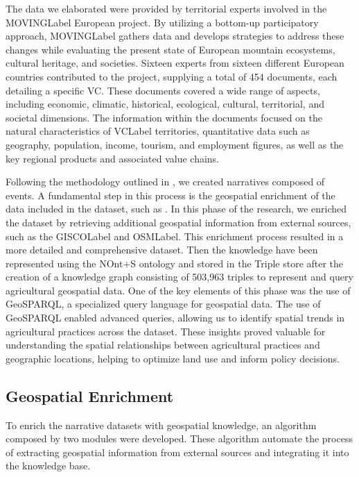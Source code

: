 The data we elaborated were provided by territorial experts involved in the \acrshort{MOVINGLabel} European project. By utilizing a bottom-up participatory approach, \acrshort{MOVINGLabel} gathers data and develops strategies to address these changes while evaluating the present state of European mountain ecosystems, cultural heritage, and societies. Sixteen experts from sixteen different European countries contributed to the project, supplying a total of 454 documents, each detailing a specific VC. These documents covered a wide range of aspects, including economic, climatic, historical, ecological, cultural, territorial, and societal dimensions. The information within the documents focused on the natural characteristics of \acrshort{VCLabel} territories, quantitative data such as geography, population, income, tourism, and employment figures, as well as the key regional products and associated value chains.

Following the methodology outlined in , we created narratives composed of events. A fundamental step in this process is the geospatial enrichment of the data included in the dataset, such as . In this phase of the research, we enriched the dataset by retrieving additional geospatial information from external sources, such as the \acrfull{GISCOLabel}\cite{GISCOEurostat} and \acrfull{OSMLabel}\cite{OpenStreetMap}. This enrichment process resulted in a more detailed and comprehensive dataset. Then the knowledge have been represented using the NOnt+S ontology and stored in the Triple store after the creation of a knowledge graph consisting of 503,963 triples to represent and query agricultural geospatial data. One of the key elements of this phase was the use of GeoSPARQL, a specialized query language for geospatial data. The use of GeoSPARQL enabled advanced queries, allowing us to identify spatial trends in agricultural practices across the dataset. These insights proved valuable for understanding the spatial relationships between agricultural practices and geographic locations, helping to optimize land use and inform policy decisions.

\subsection{Geospatial Enrichment}\label{VII-subsec:geospatialEnrichment}
To enrich the narrative datasets with geospatial knowledge, an algorithm composed by two modules were developed. These algorithm automate the process of extracting geospatial information from external sources and integrating it into the knowledge base.

